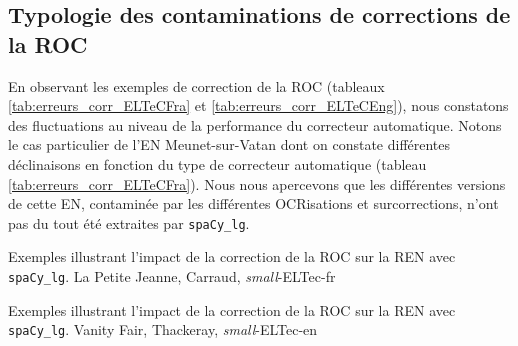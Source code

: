 \subsection{Typologie des contaminations de corrections de la ROC}
\label{subsec:Typologie_COR-OCR-IMPACT-NER}

En observant les exemples de correction de la ROC (tableaux \ref{tab:erreurs_corr_ELTeCFra} et \ref{tab:erreurs_corr_ELTeCEng}), nous constatons des fluctuations au niveau de la performance du correcteur automatique.
Notons le cas particulier de l'EN \og{}Meunet-sur-Vatan\fg{} dont on constate différentes déclinaisons en fonction du type de correcteur automatique (tableau \ref{tab:erreurs_corr_ELTeCFra}). Nous nous apercevons que les différentes versions de cette EN, contaminée par les différentes OCRisations et surcorrections, n'ont pas du tout été extraites par \texttt{spaCy\_lg}.

\begin{table}[h!]
\scriptsize
    \centering
   
     \caption{Exemples illustrant l'impact de la correction de la ROC sur la REN avec \texttt{spaCy\_lg}. {\normalfont La Petite Jeanne}, Carraud, \textit{small}-ELTec-fr}
    \label{tab:erreurs_corr_ELTeCFra}
\end{table}

\begin{table}[h!]
\scriptsize
    \centering
   
    \caption{Exemples illustrant l'impact de la correction de la ROC sur la REN avec \texttt{spaCy\_lg}. {\normalfont Vanity Fair}, Thackeray, \textit{small}-ELTec-en}
    \label{tab:erreurs_corr_ELTeCEng}
\end{table}

